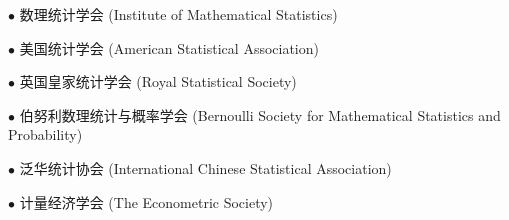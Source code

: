 \documentclass[margin, line]{res}
\begin{document}
\begin{resume}
        $\bullet$ 数理统计学会 (Institute of Mathematical Statistics)

        \vspace*{-3mm}

        $\bullet$ 美国统计学会 (American Statistical Association)

        \vspace*{-3mm}

        $\bullet$ 英国皇家统计学会 (Royal Statistical Society)
        \vspace*{-3mm}

        $\bullet$ 伯努利数理统计与概率学会 (Bernoulli Society for Mathematical Statistics and Probability)
        \vspace*{-3mm}

        $\bullet$ 泛华统计协会 (International Chinese Statistical Association)

        \vspace*{-3mm}

        $\bullet$ 计量经济学会 (The Econometric Society)

        \vspace*{-2mm}
	\end{resume}
\end{document}
